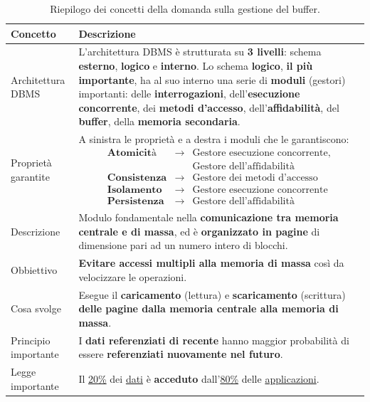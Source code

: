 \documentclass[a4paper]{article}
\begin{document}
\begin{enumerate}
		\begin{table}[!htp]
			\centering
			\begin{tabular}{@{} l p{23em} @{}}
				\toprule
				Concetto & Descrizione \\
				\midrule
				Architettura DBMS & L'architettura DBMS è strutturata su \textbf{3 livelli}: schema \textbf{esterno}, \textbf{logico} e \textbf{interno}. Lo schema \textbf{logico}, \textbf{il più importante}, ha al suo interno una serie di \textbf{moduli} (gestori) importanti: delle \textbf{interrogazioni}, dell'\textbf{esecuzione concorrente}, dei \textbf{metodi d'accesso}, dell'\textbf{affidabilità}, del \textbf{buffer}, della \textbf{memoria secondaria}. \\ [.7em]
				Proprietà garantite & A sinistra le proprietà e a destra i moduli che le garantiscono:
				\begin{equation*}
					\begin{array}{lll}
						\textbf{Atomicità}	&\rightarrow& \text{Gestore esecuzione concorrente,} \\
											&			& \text{Gestore dell'affidabilità} \\ [.5em]
						\textbf{Consistenza}&\rightarrow& \text{Gestore dei metodi d'accesso} \\ [.5em]
						\textbf{Isolamento}	&\rightarrow& \text{Gestore esecuzione concorrente} \\ [.5em]
						\textbf{Persistenza}&\rightarrow& \text{Gestore dell'affidabilità}
					\end{array}
				\end{equation*} \\ [.7em]
				Descrizione & Modulo fondamentale nella \textbf{comunicazione tra memoria centrale e di massa}, ed è \textbf{organizzato in pagine} di dimensione pari ad un numero intero di blocchi. \\ [.7em]
				Obbiettivo 	& \textbf{Evitare accessi multipli alla memoria di massa} così da velocizzare le operazioni. \\ [.7em]
				Cosa svolge & Esegue il \textbf{caricamento} (lettura) e \textbf{scaricamento} (scrittura) \textbf{delle pagine dalla memoria centrale alla memoria di massa}. \\ [.7em]
				Principio importante & I \textbf{dati referenziati di recente} hanno maggior probabilità di essere \textbf{referenziati nuovamente nel futuro}. \\ [.7em]
				Legge importante & Il \underline{20\%} dei \underline{dati} è \textbf{acceduto} dall'\underline{80\%} delle \underline{applicazioni}. \\
				\bottomrule
			\end{tabular}
			\caption{Riepilogo dei concetti della domanda sulla gestione del buffer.}
		\end{table}\newpage
		

\end{enumerate}
\end{document}
